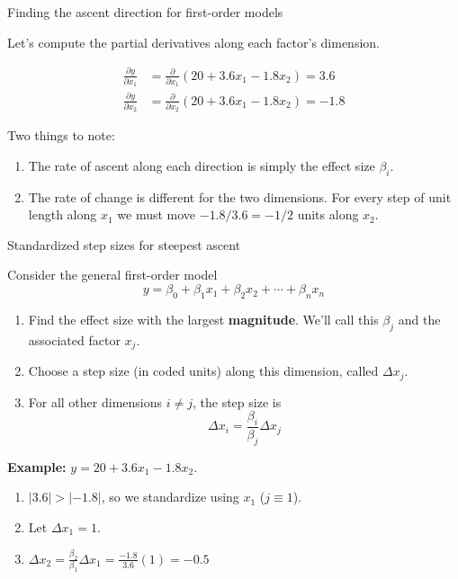 \documentclass[10pt]{beamer}\usepackage[]{graphicx}\usepackage[]{color}
\begin{document}
\begin{frame}{Finding the ascent direction for first-order models}

Let's compute the partial derivatives along each factor's dimension.

\begin{align*}
  \frac{\partial y}{\partial x_1} &= \frac{\partial}{\partial x_1}\left( 20 + 3.6x_1 - 1.8x_2 \right) = 3.6 \\
  \frac{\partial y}{\partial x_2} &= \frac{\partial}{\partial x_2}\left( 20 + 3.6x_1 - 1.8x_2 \right) = -1.8
\end{align*}

\pause
\bigskip
Two things to note:
\begin{enumerate}
  \item The rate of ascent along each direction is simply the effect size $\beta_i$.
  \item The rate of change is different for the two dimensions. For every step of unit length along $x_1$ we must move $-1.8/3.6=-1/2$ units along $x_2$.
\end{enumerate}

\end{frame}

\begin{frame}{Standardized step sizes for steepest ascent}

Consider the general first-order model
\[ y = \beta_0 + \beta_1x_1 + \beta_2x_2 + \cdots + \beta_nx_n \]

\begin{enumerate}
  \item Find the effect size with the largest \textbf{magnitude}. We'll call this $\beta_j$ and the associated factor $x_j$.
  \item Choose a step size (in coded units) along this dimension, called $\Delta x_j$.
  \item For all other dimensions $i\ne j$, the step size is
    \[ \Delta x_i = \frac{\beta_i}{\beta_j}\Delta x_j \]
\end{enumerate}

\pause
\textbf{Example:} $y = 20 + 3.6x_1 - 1.8x_2$.
\begin{enumerate}
  \item<3-> $|3.6| > |-1.8|$, so we standardize using $x_1$ ($j\equiv1$).
  \item<4-> Let $\Delta x_1=1$.
  \item<5-> $\Delta x_2 = \frac{\beta_2}{\beta_1}\Delta x_1 = \frac{-1.8}{3.6}(1) = -0.5$
\end{enumerate}

\end{frame}
\end{document}

